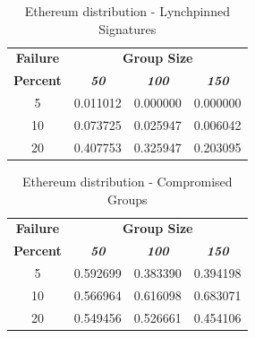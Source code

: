 \documentclass[conference]{IEEEtran}
\begin{document}
        \begin{table}[h!]
            \caption{Ethereum distribution - Lynchpinned Signatures}
            \begin{center}
            \begin{tabular}{|c|c|c|c|}
            \hline
            \textbf{Failure}&\multicolumn{3}{|c|}{\textbf{Group Size}} \\
            \cline{2-4} 
            \textbf{Percent} & \textbf{\textit{50}}& \textbf{\textit{100}}& \textbf{\textit{150}} \\
            \hline
            5 &  0.011012 &  0.000000 &  0.000000 \\
            \hline
            10 &  0.073725 &  0.025947 &  0.006042 \\
            \hline
            20 &  0.407753 &  0.325947 &  0.203095 \\
            \hline
            \end{tabular}
            \label{lynchpinned_table2}
            \end{center}
        \end{table}

        \begin{table}[h!]
            \caption{Ethereum distribution - Compromised Groups}
            \begin{center}
            \begin{tabular}{|c|c|c|c|}
            \hline
            \textbf{Failure}&\multicolumn{3}{|c|}{\textbf{Group Size}} \\
            \cline{2-4} 
            \textbf{Percent} & \textbf{\textit{50}}& \textbf{\textit{100}}& \textbf{\textit{150}} \\
            \hline
            5 &  0.592699 &  0.383390 &  0.394198 \\
            \hline
            10 &  0.566964 &  0.616098 &  0.683071 \\
            \hline
            20 &  0.549456 &  0.526661 &  0.454106 \\
            \hline
            \end{tabular}
            \label{compromised_table2}
            \end{center}
        \end{table}
\end{document}
